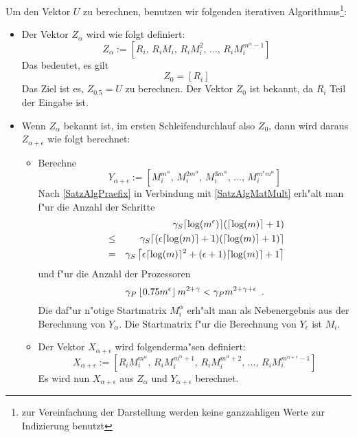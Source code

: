 Um den Vektor $U$ zu berechnen, benutzen wir folgenden iterativen 
Algorithmus\footnote{zur Vereinfachung der Darstellung werden keine 
ganzzahligen Werte zur Indizierung benutzt}: \nopagebreak[3]
\begin{itemize}
\item
      Der Vektor $Z_\alpha$ wird wie folgt definiert:
      \[ 
         Z_\alpha := \left[ R_i,\, R_i M_i,\, R_i M_i^2,\, 
                           \ldots ,\, R_i M_i^{m^\alpha - 1} 
                     \right]
      \]
      Das bedeutet, es gilt
      \[
          Z_0 = [ R_i ]
      \]
      Das Ziel ist es, $Z_{0.5}= U$ zu berechnen. 
      Der Vektor $Z_0$ ist bekannt, da $R_i$ Teil der Eingabe ist.
\item
      Wenn $Z_{\alpha}$ bekannt ist, im ersten Schleifendurchlauf
      also $Z_0$, dann wird daraus $Z_{\alpha+\epsilon}$ wie folgt 
      berechnet:
      \begin{itemize}
      \item
            Berechne
            \[ Y_{\alpha+\epsilon} :=
               \left[
                   M_i^{m^\alpha},\, M_i^{2m^\alpha},\, M_i^{3m^\alpha},
                      \, \ldots,\,
                   M_i^{m^\epsilon m^\alpha}
               \right]
            \]
            Nach \ref{SatzAlgPraefix} in Verbindung mit \ref{SatzAlgMatMult}
            erh"alt man f"ur die Anzahl der Schritte
            \begin{eqnarray*}
               & & \gamma_S \lceil \log(m^\epsilon) \rceil 
                   (\lceil \log(m) \rceil +1)
            \\ & \leq & %
                        \gamma_S \lceil (\epsilon \lceil \log(m) \rceil + 1)
                            (\lceil \log(m) \rceil + 1 )
                     \rceil
            \\ & = & \gamma_S \lc \epsilon \lceil \log(m) \rceil^2 +
                         (\epsilon + 1) \lceil \log(m) \rceil + 1
                     \rc
            \end{eqnarray*}
            und f"ur die Anzahl der
            Prozessoren 
            \[ \gamma_P \left\lfloor 0.75 m^\epsilon \right\rfloor m^{2+\gamma}
                   <
               \gamma_P m^{2+\gamma+\epsilon} \mbox{\hspace{0.5em}.}
            \]
            Die
            daf"ur n"otige Startmatrix $M_i^\alpha$ erh"alt man als
            Nebenergebnis aus der Berechnung von $Y_\alpha$. Die Startmatrix
            f"ur die Berechnung von $Y_\epsilon$ ist $M_i$.
      \item
            Der Vektor $X_{\alpha+\epsilon}$ wird folgenderma"sen definiert:
            \[
               X_{\alpha+\epsilon} := 
               \left[
                   R_i M_i^{m^\alpha}, \,R_i M_i^{m^\alpha + 1}, \,
                   R_i M_i^{m^\alpha + 2}, \, \ldots, 
                   \, R_i M_i^{m^{\alpha+\epsilon}-1}
               \right]
            \]
            Es wird nun $X_{\alpha+\epsilon}$ aus $Z_\alpha$ und 
            $Y_{\alpha+\epsilon}$ berechnet.


\end{itemize}
\end{itemize}

